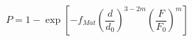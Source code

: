 \documentclass[12pt]{article}
\begin{document}
$$
P = 1 -\exp\left[-f_{Mat}\left(\frac{d}{d_{0}}\right)^{3-2m}\left(\frac{F}{F_0}\right)^{m}\right]
$$
\end{document}
